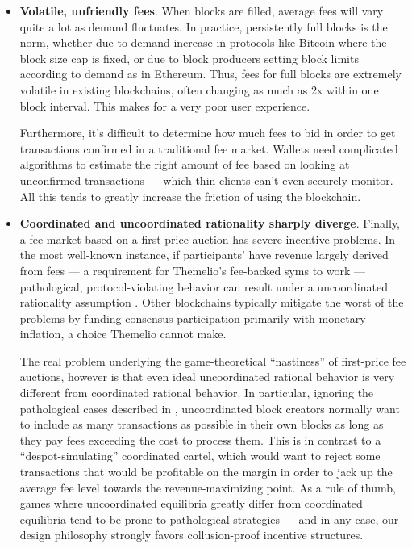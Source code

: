 \documentclass[letterpaper,12pt,oneside]{article}
\begin{document}
\begin{itemize}
    \item \textbf{Volatile, unfriendly fees}. When blocks are filled, average fees will vary quite a lot as demand fluctuates. In practice, persistently full blocks is the norm, whether due to demand increase in protocols like Bitcoin where the block size cap is fixed, or due to block producers setting block limits according to demand as in Ethereum. Thus, fees for full blocks are extremely volatile in existing blockchains, often changing as much as 2x within one block interval. This makes for a very poor user experience.

          Furthermore, it's difficult to determine how much fees to bid in order to get transactions confirmed in a traditional fee market. Wallets need complicated algorithms to estimate the right amount of fee based on looking at unconfirmed transactions --- which thin clients can't even securely monitor. All this tends to greatly increase the friction of using the blockchain.
    \item \textbf{Coordinated and uncoordinated rationality sharply diverge}. Finally, a fee market based on a first-price auction has severe incentive problems. In the most well-known instance, if participants' have revenue largely derived from fees --- a requirement for Themelio's fee-backed syms to work --- pathological, protocol-violating behavior can result under a uncoordinated rationality assumption \cite{carlsten2016instability}. Other blockchains typically mitigate the worst of the problems by funding consensus participation primarily with monetary inflation, a choice Themelio cannot make.

          The real problem underlying the game-theoretical ``nastiness'' of first-price fee auctions, however is that even ideal uncoordinated rational behavior is very different from coordinated rational behavior. In particular, ignoring the pathological cases described in \cite{carlsten2016instability}, uncoordinated block creators normally want to include as many transactions as possible in their own blocks as long as they pay fees exceeding the cost to process them. This is in contrast to a ``despot-simulating'' coordinated cartel, which would want to reject some transactions that would be profitable on the margin in order to jack up the average fee level towards the revenue-maximizing point. As a rule of thumb, games where uncoordinated equilibria greatly differ from coordinated equilibria tend to be prone to pathological strategies --- and in any case, our design philosophy strongly favors collusion-proof incentive structures.
\end{itemize}
\end{document}
